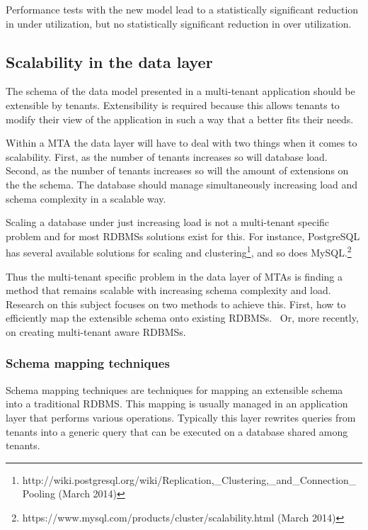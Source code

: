 Performance tests with the new model lead to a statistically significant reduction in under utilization, but no statistically significant reduction in over utilization.


\subsection{Scalability in the data layer}
The schema of the data model presented in a multi-tenant application should be extensible by tenants.
Extensibility is required because this allows tenants to modify their view of the application in such a way that a better fits their needs.

Within a \ac{MTA} the data layer will have to deal with two things when it comes to scalability.
First, as the number of tenants increases so will database load.
Second, as the number of tenants increases so will the amount of extensions on the the schema.
The database should  manage simultaneously increasing load and schema complexity in a scalable way.

Scaling a database under just increasing load is not a multi-tenant specific problem and for most \acp{RDBMS} solutions exist for this. 
For instance, PostgreSQL has several available solutions for scaling and clustering\footnote{http://wiki.postgresql.org/wiki/Replication,\_Clustering,\_and\_Connection\_Pooling (March 2014)}, and so does MySQL.\footnote{https://www.mysql.com/products/cluster/scalability.html (March 2014)}

Thus the multi-tenant specific problem in the data layer of \acp{MTA} is finding a method that remains scalable with increasing schema complexity and load.
Research on this subject focuses on two methods to achieve this.
First, how to efficiently map the extensible schema onto existing \acp{RDBMS}.~\cite{aulbach2008multi, aulbach2009comparison} 
Or, more recently, on creating multi-tenant aware \acp{RDBMS}.~\cite{schiller2011native, aulbach2011extensibility} 

\subsubsection{Schema mapping techniques}
Schema mapping techniques are techniques for mapping an extensible schema into a traditional \ac{RDBMS}.
This mapping is usually managed in an application layer that performs various operations. 
Typically this layer rewrites queries from tenants into a generic query that can be executed on a database shared among tenants.

